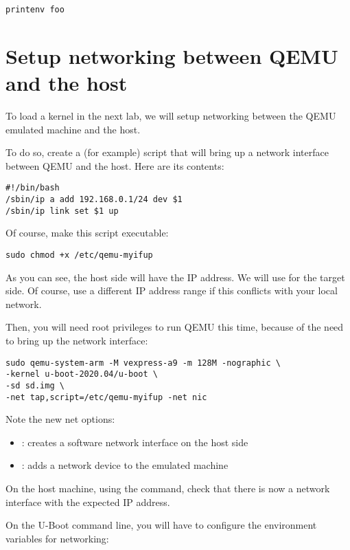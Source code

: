 \begin{verbatim}
printenv foo
\end{verbatim}

\section{Setup networking between QEMU and the host}

To load a kernel in the next lab, we will setup networking between the QEMU emulated
machine and the host.

To do so, create a  (for example)
script that will bring up a network interface between QEMU and the host.
Here are its contents:

\begin{verbatim}
#!/bin/bash
/sbin/ip a add 192.168.0.1/24 dev $1
/sbin/ip link set $1 up
\end{verbatim}

Of course, make this script executable:
\begin{verbatim}
sudo chmod +x /etc/qemu-myifup
\end{verbatim}

As you can see, the host side will have the  IP
address. We will use  for the target side.
Of course, use a different IP address range if this conflicts with your
local network.

Then, you will need root privileges to run QEMU this time,
because of the need to bring up the network interface:

\begin{verbatim}
sudo qemu-system-arm -M vexpress-a9 -m 128M -nographic \
-kernel u-boot-2020.04/u-boot \
-sd sd.img \
-net tap,script=/etc/qemu-myifup -net nic
\end{verbatim}

Note the new net options:
\begin{itemize}
\item {}: creates a software network interface on the host side
\item \code{-net nic}: adds a network device to the emulated machine
\end{itemize}

On the host machine, using the \code{ip a} command, check that
there is now a  network interface with the expected IP
address.

On the U-Boot command line, you will have to configure the environment
variables for networking:

